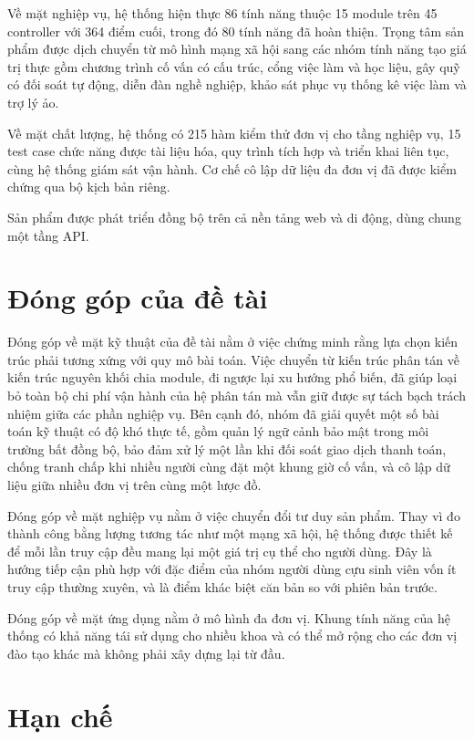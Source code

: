 \documentclass[12pt,a4paper,oneside]{report}
\begin{document}
Về mặt nghiệp vụ, hệ thống hiện thực 86 tính năng thuộc 15 module trên 45 controller với 364 điểm cuối, trong đó 80 tính năng đã hoàn thiện. Trọng tâm sản phẩm được dịch chuyển từ mô hình mạng xã hội sang các nhóm tính năng tạo giá trị thực gồm chương trình cố vấn có cấu trúc, cổng việc làm và học liệu, gây quỹ có đối soát tự động, diễn đàn nghề nghiệp, khảo sát phục vụ thống kê việc làm và trợ lý ảo.

Về mặt chất lượng, hệ thống có 215 hàm kiểm thử đơn vị cho tầng nghiệp vụ, 15 test case chức năng được tài liệu hóa, quy trình tích hợp và triển khai liên tục, cùng hệ thống giám sát vận hành. Cơ chế cô lập dữ liệu đa đơn vị đã được kiểm chứng qua bộ kịch bản riêng.

Sản phẩm được phát triển đồng bộ trên cả nền tảng web và di động, dùng chung một tầng API.

\section{Đóng góp của đề tài}

Đóng góp về mặt kỹ thuật của đề tài nằm ở việc chứng minh rằng lựa chọn kiến trúc phải tương xứng với quy mô bài toán. Việc chuyển từ kiến trúc phân tán về kiến trúc nguyên khối chia module, đi ngược lại xu hướng phổ biến, đã giúp loại bỏ toàn bộ chi phí vận hành của hệ phân tán mà vẫn giữ được sự tách bạch trách nhiệm giữa các phần nghiệp vụ. Bên cạnh đó, nhóm đã giải quyết một số bài toán kỹ thuật có độ khó thực tế, gồm quản lý ngữ cảnh bảo mật trong môi trường bất đồng bộ, bảo đảm xử lý một lần khi đối soát giao dịch thanh toán, chống tranh chấp khi nhiều người cùng đặt một khung giờ cố vấn, và cô lập dữ liệu giữa nhiều đơn vị trên cùng một lược đồ.

Đóng góp về mặt nghiệp vụ nằm ở việc chuyển đổi tư duy sản phẩm. Thay vì đo thành công bằng lượng tương tác như một mạng xã hội, hệ thống được thiết kế để mỗi lần truy cập đều mang lại một giá trị cụ thể cho người dùng. Đây là hướng tiếp cận phù hợp với đặc điểm của nhóm người dùng cựu sinh viên vốn ít truy cập thường xuyên, và là điểm khác biệt căn bản so với phiên bản trước.

Đóng góp về mặt ứng dụng nằm ở mô hình đa đơn vị. Khung tính năng của hệ thống có khả năng tái sử dụng cho nhiều khoa và có thể mở rộng cho các đơn vị đào tạo khác mà không phải xây dựng lại từ đầu.

\section{Hạn chế}
\label{sec:limitations}
\end{document}
